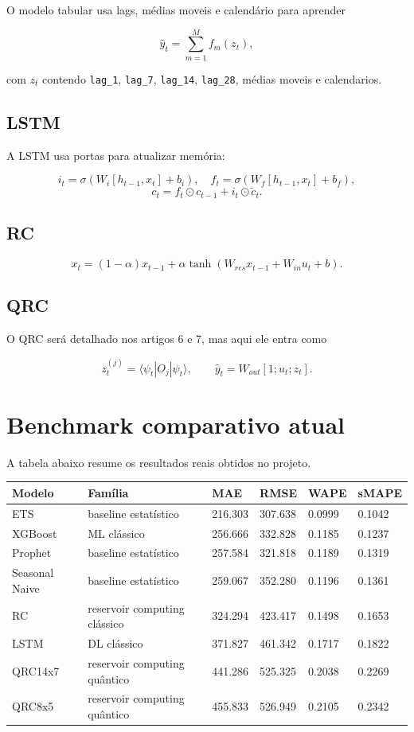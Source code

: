 \documentclass[12pt]{article}
\begin{document}
O modelo tabular usa lags, médias moveis e calendário para aprender

\[
\hat{y}_t = \sum_{m=1}^M f_m(z_t),
\]

com \(z_t\) contendo \texttt{lag\_1}, \texttt{lag\_7}, \texttt{lag\_14}, \texttt{lag\_28}, médias moveis e calendarios.

\subsection{LSTM}\label{45-lstm}

A LSTM usa portas para atualizar memória:

\[
i_t = \sigma(W_i [h_{t-1}, x_t] + b_i), \quad
f_t = \sigma(W_f [h_{t-1}, x_t] + b_f),
\]
\[
c_t = f_t \odot c_{t-1} + i_t \odot \tilde{c}_t.
\]

\subsection{RC}\label{46-rc}

\[
x_t = (1 - \alpha) x_{t-1} + \alpha \tanh(W_{res} x_{t-1} + W_{in} u_t + b).
\]

\subsection{QRC}\label{47-qrc}

O QRC será detalhado nos artigos 6 e 7, mas aqui ele entra como

\[
z_t^{(j)} = \langle \psi_t | O_j | \psi_t \rangle,
\qquad
\hat{y}_t = W_{out} [1; u_t; z_t].
\]

\section{Benchmark comparativo atual}\label{5-benchmark-comparativo-atual}

A tabela abaixo resume os resultados reais obtidos no projeto.

\begin{longtable}[]{@{}llllll@{}}
\toprule\noalign{}
Modelo & Família & MAE & RMSE & WAPE & sMAPE \\
\midrule\noalign{}
\endhead
\bottomrule\noalign{}
\endlastfoot
ETS & baseline estatístico & 216.303 & 307.638 & 0.0999 & 0.1042 \\
XGBoost & ML clássico & 256.666 & 332.828 & 0.1185 & 0.1237 \\
Prophet & baseline estatístico & 257.584 & 321.818 & 0.1189 & 0.1319 \\
Seasonal Naive & baseline estatístico & 259.067 & 352.280 & 0.1196 & 0.1361 \\
RC & reservoir computing clássico & 324.294 & 423.417 & 0.1498 & 0.1653 \\
LSTM & DL clássico & 371.827 & 461.342 & 0.1717 & 0.1822 \\
QRC14x7 & reservoir computing quântico & 441.286 & 525.325 & 0.2038 & 0.2269 \\
QRC8x5 & reservoir computing quântico & 455.833 & 526.949 & 0.2105 & 0.2342 \\
\end{longtable}
\end{document}
